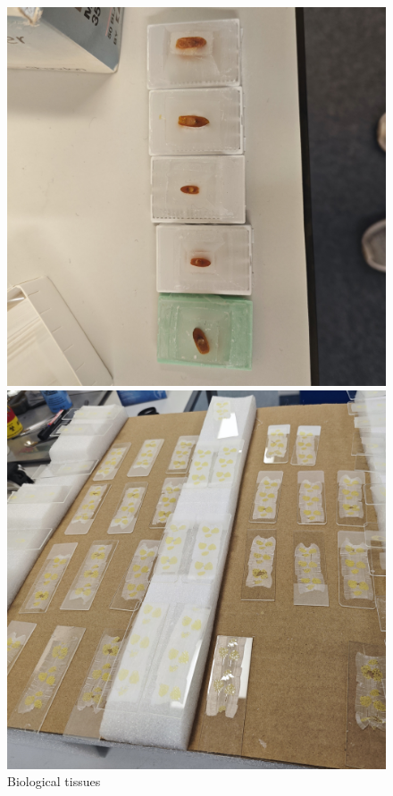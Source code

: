 
\begin{figure}[htbp]
    \centering
    \begin{minipage}{0.3\textwidth}
        \centering
        \includegraphics[width=\textwidth]{./fig/sample.jpg}
        \caption{Biological tissues}
        \label{label:sample}
    \end{minipage}
    \begin{minipage}{0.3\textwidth}
        \centering
        \includegraphics[width=\textwidth]{./fig/采集样本.jpg}

\end{minipage}
\end{figure}
